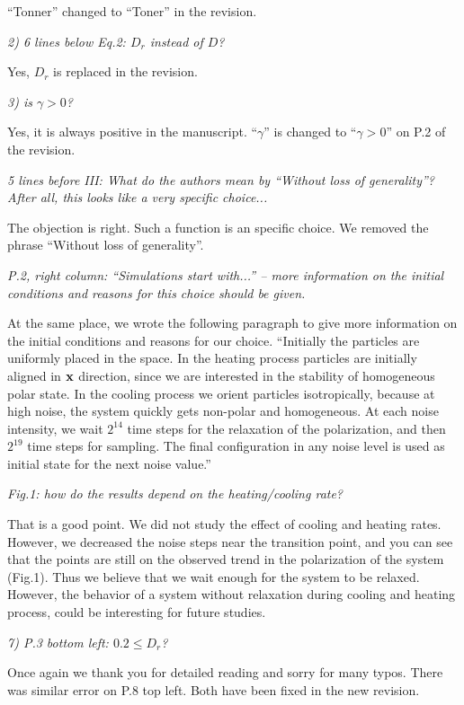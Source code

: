 \documentclass[a4paper,11pt]{letter}
\newcommand{\rf}[1]{\textit{\textcolor{hlcolor}{#1}}}
\begin{document}
``Tonner'' changed to ``Toner'' in the revision.

\rf{2) 6 lines below Eq.2: $D_r$ instead of $D$?}

Yes, $D_r$ is replaced in the revision.

\rf{3) is $\gamma>0$?}

Yes, it is always positive in the manuscript. ``$\gamma$'' is changed to ``$\gamma>0$'' on P.2 of the revision.

\rf{5 lines before III: What do the authors mean by ``Without loss of generality''? After all, this looks like a very specific choice...}

The objection is right. Such a function is an specific choice. We removed the phrase ``Without loss of generality''.

\rf{P.2, right column: ``Simulations start with...'' -- more information on the initial conditions and reasons for this choice should be given.}

At the same place, we wrote the following paragraph to give more information on the initial conditions and reasons for our choice. ``Initially the particles are uniformly placed in the space. In the heating process particles are initially aligned in $\rm \bf x$ direction, since we are interested in the stability of homogeneous polar state. In the cooling process we orient particles isotropically, because at high noise, the system quickly gets non-polar and homogeneous. At each noise intensity, we wait $2^{14}$ time steps for the relaxation of the polarization, and then $2^{19}$ time steps for sampling. The final configuration in any noise level is used as initial state for the next noise value.''

\rf{Fig.1: how do the results depend on the heating/cooling rate?}

That is a good point. We did not study the effect of cooling and heating rates. However, we decreased the noise steps near the transition point, and you can see that the points are still on the observed trend in the polarization of the system (Fig.1). Thus we believe that we wait enough for the system to be relaxed. However, the behavior of a system without relaxation during cooling and heating process, could be interesting for future studies.

\rf{7) P.3 bottom left: $0.2 \leq D_r$?}

Once again we thank you for detailed reading and sorry for many typos. There was similar error on P.8 top left. Both have been fixed in the new revision.
\end{document}
